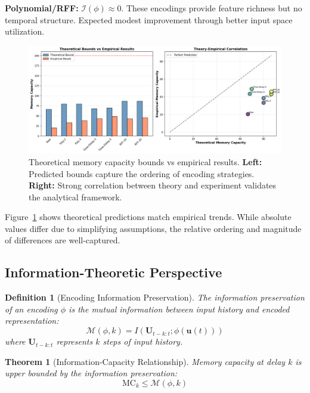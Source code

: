 \documentclass[11pt]{article}
\newtheorem{theorem}{Theorem}
\newtheorem{definition}{Definition}
\begin{document}
\textbf{Polynomial/RFF:} $\mathcal{I}(\phi) \approx 0$. These encodings provide feature richness but no temporal structure. Expected modest improvement through better input space utilization.

\begin{figure}[t]
    \centering
    \includegraphics[width=\textwidth]{theory_vs_empirical.png}
    \caption{Theoretical memory capacity bounds vs empirical results. \textbf{Left:} Predicted bounds capture the ordering of encoding strategies. \textbf{Right:} Strong correlation between theory and experiment validates the analytical framework.}
    \label{fig:theory_empirical}
\end{figure}

Figure~\ref{fig:theory_empirical} shows theoretical predictions match empirical trends. While absolute values differ due to simplifying assumptions, the relative ordering and magnitude of differences are well-captured.

\subsection{Information-Theoretic Perspective}

\begin{definition}[Encoding Information Preservation]
The information preservation of an encoding $\phi$ is the mutual information between input history and encoded representation:
\begin{equation}
\mathcal{M}(\phi, k) = I(\mathbf{U}_{t-k:t}; \phi(\mathbf{u}(t)))
\end{equation}
where $\mathbf{U}_{t-k:t}$ represents $k$ steps of input history.
\end{definition}

\begin{theorem}[Information-Capacity Relationship]
Memory capacity at delay $k$ is upper bounded by the information preservation:
\begin{equation}
\text{MC}_k \leq \mathcal{M}(\phi, k)
\end{equation}
\end{theorem}
\end{document}
